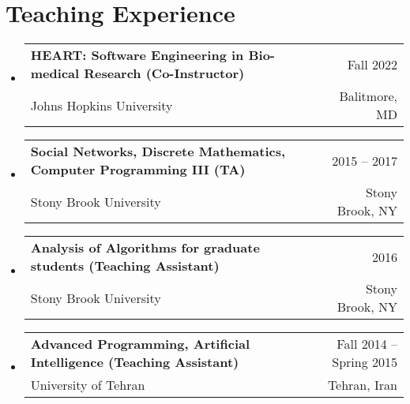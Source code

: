 \documentclass[A4,11pt]{article}
\makeatletter
\newcommand{\CVSubheading}[4]{
  \vspace{-2pt}\item
    \begin{tabular*}{0.97\textwidth}[t]{l@{\extracolsep{\fill}}r}
      \textbf{#1} & #2 \\
      \small#3 & \small #4 \\
    \end{tabular*}\vspace{-7pt}
}
\newcommand{\CVSubHeadingListStart}{\begin{itemize}[leftmargin=0.5cm, label={}]}
\newcommand{\CVSubHeadingListEnd}{\end{itemize}}
\makeatother
\begin{document}
\begin{comment}
Section is here as it applied to my application for positions in academia. 
Remember to tailor the resume for to the position.
\end{comment}

\section{Teaching Experience}
  \CVSubHeadingListStart
  \CVSubheading
  {HEART: Software Engineering in Bio-medical Research (Co-Instructor)}{Fall 2022}
  {Johns Hopkins University}{Balitmore, MD}

  \CVSubheading
      {Social Networks, Discrete Mathematics, Computer Programming III (TA)}{2015 -- 2017}
      {Stony Brook University}{Stony Brook, NY}
    \CVSubheading
      {Analysis of Algorithms for graduate students (Teaching Assistant)}{2016}
      {Stony Brook University}{Stony Brook, NY}
    \CVSubheading
      {Advanced Programming, Artificial Intelligence (Teaching Assistant)}{Fall 2014 -- Spring 2015}
      {University of Tehran}{Tehran, Iran}
  \CVSubHeadingListEnd
  
%

	\nocite{*}
	
\end{document}
